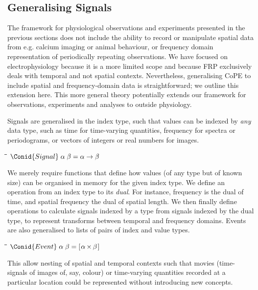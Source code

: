 \subsection*{Generalising Signals}
\label{sec-gensig}


The framework for physiological observations and experiments presented
in the previous sections does not include the ability to record or
manipulate spatial data from e.g. calcium imaging or animal behaviour,
or frequency domain representation of periodically repeating
observations. We have focused on electrophysiology because it is a
more limited scope and because FRP exclusively deals with temporal and
not spatial contexts. Nevertheless, generalising CoPE to include
spatial and frequency-domain data is straightforward; we outline this
extension here. This more general theory potentially extends our
framework for observations, experiments and analyses to outside
physiology.

Signals are generalised in the index type, such that values can
be indexed by \emph{any} data type, such as time for time-varying
quantities, frequency for spectra or periodograms, or vectors of
integers or real numbers for images.
\begin{tabbing}
\qquad\=\hspace{\lwidth}\=\hspace{\cwidth}\=\+\kill
$\Conid{Signal}\;\alpha\;\beta\mathrel{=}\alpha \to \beta$
\end{tabbing}
We merely require functions that define how values (of any type but of
known size) can be organised in memory for the given index type. We
define an operation from an index type to its \emph{dual}. For
instance, frequency is the dual of time, and spatial frequency the
dual of spatial length. We then finally define operations to
calculate signals indexed by a type from signals indexed by the
dual type, to represent transforms between temporal and frequency
domains. Events are also generalised to lists of pairs of index and
value types. 
\begin{tabbing}
\qquad\=\hspace{\lwidth}\=\hspace{\cwidth}\=\+\kill
${\Conid{Event}\;\alpha\;\beta\mathrel{=}[\mskip1.5mu \alpha\;\!\!\times\!\!\;\beta\mskip1.5mu]}$
\end{tabbing}
This allow nesting of spatial and temporal contexts such that movies
(time-signals of images of, say, colour) or time-varying quantities
recorded at a particular location \citep[for instance spot calcium
measurements as space-events of time-signals of
concentration;][]{DiGregorio1999} could be represented without
introducing new concepts.  

